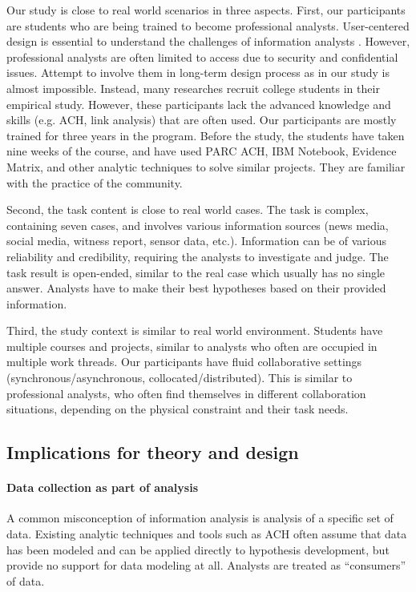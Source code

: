 Our study is close to real world scenarios in three aspects. First, our participants are students who are being trained to become professional analysts. User-centered design is essential to understand the challenges of information analysts \cite{Scholtz2014}. However, professional analysts are often limited to access due to security and confidential issues. Attempt to involve them in long-term design process as in our study is almost impossible. Instead, many researches recruit college students in their empirical study. However, these participants lack the advanced knowledge and skills (e.g. ACH, link analysis) that are often used. Our participants are mostly trained for three years in the program. Before the study, the students have taken nine weeks of the course, and have used PARC ACH, IBM Notebook, Evidence Matrix, and other analytic techniques to solve similar projects. They are familiar with the practice of the community.

Second, the task content is close to real world cases. The task is complex, containing seven cases, and involves various information sources (news media, social media, witness report, sensor data, etc.). Information can be of various reliability and credibility, requiring the analysts to investigate and judge. The task result is open-ended, similar to the real case which usually has no single answer. Analysts have to make their best hypotheses based on their provided information.

Third, the study context is similar to real world environment. Students have multiple courses and projects, similar to analysts who often are occupied in multiple work threads. Our participants have fluid collaborative settings (synchronous/asynchronous, collocated/distributed). This is similar to professional analysts, who often find themselves in different collaboration situations, depending on the physical constraint and their task needs.


\subsection{Implications for theory and design} 

\paragraph{Data collection as part of analysis}
A common misconception of information analysis is analysis of a specific set of data. Existing analytic techniques and tools such as ACH often assume that data has been modeled and can be applied directly to hypothesis development, but provide no support for data modeling at all. Analysts are treated as ``consumers'' of data.

